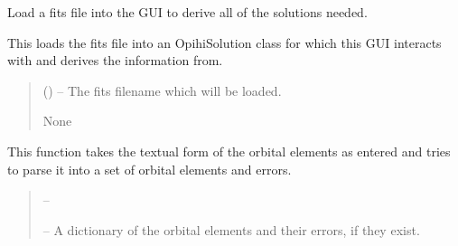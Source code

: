 \documentclass[letterpaper,11pt,english]{sphinxmanual}
\begin{document}
\begin{savenotes}
\begin{fulllineitems}
\begin{savenotes}\begin{fulllineitems}
\label{\detokenize{code/opihiexarata.gui.manual:opihiexarata.gui.manual.OpihiManualWindow._load_fits_file}}
\pysigstartsignatures
{}
\pysigstopsignatures
\sphinxAtStartPar
Load a fits file into the GUI to derive all of the solutions needed.

\sphinxAtStartPar
This loads the fits file into an OpihiSolution class for which this
GUI interacts with and derives the information from.
\begin{quote}\begin{description}
\sphinxAtStartPar
{} () – The fits filename which will be loaded.

\sphinxAtStartPar
None

\end{description}\end{quote}

\end{fulllineitems}\end{savenotes}


\begin{savenotes}\begin{fulllineitems}
\label{\detokenize{code/opihiexarata.gui.manual:opihiexarata.gui.manual.OpihiManualWindow._parse_custom_orbital_elements}}
\pysigstartsignatures
{}
\pysigstopsignatures
\sphinxAtStartPar
This function takes the textual form of the orbital elements as
entered and tries to parse it into a set of orbital elements and errors.
\begin{quote}\begin{description}
\sphinxAtStartPar
{} – 

\sphinxAtStartPar
{} – A dictionary of the orbital elements and their errors, if they
exist.


\end{description}
\end{quote}
\end{fulllineitems}
\end{savenotes}
\end{fulllineitems}
\end{savenotes}
\end{document}
